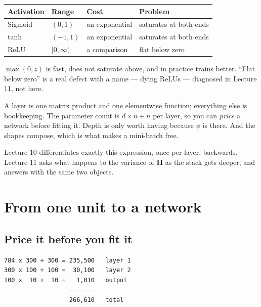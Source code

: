 \documentclass[11pt,a4paper]{article}
\begin{document}
\begin{center}
\small
\begin{tabular}{llll}
\toprule
\textbf{Activation} & \textbf{Range} & \textbf{Cost} & \textbf{Problem} \\
\midrule
Sigmoid & $(0,1)$ & an exponential & saturates at both ends \\
tanh    & $(-1,1)$ & an exponential & saturates at both ends \\
ReLU    & $[0,\infty)$ & a comparison & flat below zero \\
\bottomrule
\end{tabular}
\end{center}

$\max(0,z)$ is fast, does not saturate above, and in practice trains better.
``Flat below zero'' is a real defect with a name --- dying ReLUs --- diagnosed
in Lecture 11, not here.

\begin{keybox}[title={What the derivation buys you}]
A layer is one matrix product and one elementwise function; everything else is
bookkeeping. The parameter count is $d\times n + n$ per layer, so you can
\emph{price} a network before fitting it. Depth is only worth having because
$\phi$ is there. And the shapes compose, which is what makes a mini-batch free.

Lecture 10 differentiates exactly this expression, once per layer, backwards.
Lecture 11 asks what happens to the variance of $\mathbf{H}$ as the stack gets
deeper, and answers with the same two objects.
\end{keybox}

\section{From one unit to a network}

\subsection{Price it before you fit it}

\begin{center}
\small
\begin{verbatim}
784 x 300 + 300 = 235,500   layer 1
300 x 100 + 100 =  30,100   layer 2
100 x  10 +  10 =   1,010   output
                  -------
                  266,610   total
\end{verbatim}
\end{center}
\end{document}
